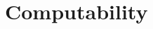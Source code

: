 \documentclass[open-logic-part]{subfiles}
\begin{document}
\part{Computability}



\OLEndPartHook
\end{document}
